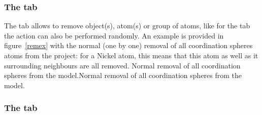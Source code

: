 \subsubsection*{The  tab}

The  tab allows to remove object(s), atom(s) or group of atoms, like for the  tab the action can also be performed randomly. 
An example is provided in figure~\ref{remex} with the normal (one by one) removal of all  coordination spheres atoms from the  project: 
for a Nickel atom, this means that this  atom as well as it surrounding  neighbours are all removed. 
{Normal removal of all  coordination spheres from the model.}{Normal removal of all  coordination spheres from the model.}

\subsubsection*{The  tab}

